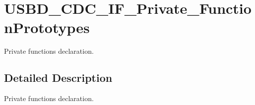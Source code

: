 \hypertarget{group__USBD__CDC__IF__Private__FunctionPrototypes}{}\section{U\+S\+B\+D\+\_\+\+C\+D\+C\+\_\+\+I\+F\+\_\+\+Private\+\_\+\+Function\+Prototypes}
\label{group__USBD__CDC__IF__Private__FunctionPrototypes}


Private functions declaration.  




\subsection{Detailed Description}
Private functions declaration. 

